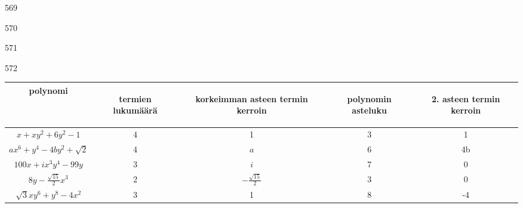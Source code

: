 \begin{Vastaus}{569}
    
\end{Vastaus}
\begin{Vastaus}{570}
	
\end{Vastaus}
\begin{Vastaus}{571}
    
\end{Vastaus}
\begin{Vastaus}{572}
    \begin{footnotesize}
    \begin{tabular}{|c|c|c|c|c|}
                                                                         \hline
polynomi
& \begin{sideways}termien lukumäärä\end{sideways}%
& \begin{sideways}korkeimman asteen termin kerroin\end{sideways}%
& \begin{sideways}polynomin asteluku\end{sideways}%
& \begin{sideways}2. asteen termin kerroin\end{sideways} \\ \hline
$ x+xy^2+6y^2-1$ 		&      4  &         1      &       3   &    1       \\ \hline
$ ax^6+y^4-4by^2+\sqrt{2}$  	&     4    &    $a$       &    6   &     4b       \\ \hline
$ 100x+ ix^3y^4-99y$          	&    3     &      $i$    &     7     &    0       \\ \hline
$ 8y-\frac{\sqrt{15}}{2}x^3$	 &     2     &    $-\frac{\sqrt{15}}{2}$    &     3    &    0   \\ \hline
$ \sqrt{3}xy^6 + y^8 - 4x^2$ 	&   3       &         1        &    8      &     -4       \\ \hline
    \end{tabular}
    \end{footnotesize}
     
\end{Vastaus}
